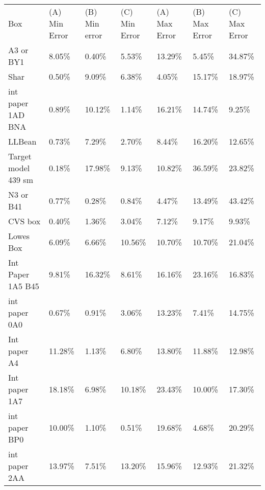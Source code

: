 \documentclass[11pt, twoside, reqno]{book}
\begin{document}
\begin{table}[]
	\centering

	\label{AR2B}
	\tiny
	\begin{tabular}{lllllll}
		Box                 & (A) Min Error & (B) Min error & (C) Min Error & (A) Max Error & (B) Max Error & (C) Max Error \\
		A3 or BY1           & 8.05\%        & 0.40\%        & 5.53\%        & 13.29\%       & 5.45\%        & 34.87\%       \\
		Shar                & 0.50\%        & 9.09\%        & 6.38\%        & 4.05\%        & 15.17\%       & 18.97\%       \\
		int paper 1AD BNA   & 0.89\%        & 10.12\%       & 1.14\%        & 16.21\%       & 14.74\%       & 9.25\%        \\
		LLBean              & 0.73\%        & 7.29\%        & 2.70\%        & 8.44\%        & 16.20\%       & 12.65\%       \\
		Target model 439 sm & 0.18\%        & 17.98\%       & 9.13\%        & 10.82\%       & 36.59\%       & 23.82\%       \\
		N3 or B41           & 0.77\%        & 0.28\%        & 0.84\%        & 4.47\%        & 13.49\%       & 43.42\%       \\
		CVS box             & 0.40\%        & 1.36\%        & 3.04\%        & 7.12\%        & 9.17\%        & 9.93\%        \\
		Lowes Box           & 6.09\%        & 6.66\%        & 10.56\%       & 10.70\%       & 10.70\%       & 21.04\%       \\
		Int Paper 1A5 B45   & 9.81\%        & 16.32\%       & 8.61\%        & 16.16\%       & 23.16\%       & 16.83\%       \\
		int paper 0A0       & 0.67\%        & 0.91\%        & 3.06\%        & 13.23\%       & 7.41\%        & 14.75\%       \\
		Int paper A4        & 11.28\%       & 1.13\%        & 6.80\%        & 13.80\%       & 11.88\%       & 12.98\%       \\
		Int paper 1A7       & 18.18\%       & 6.98\%        & 10.18\%       & 23.43\%       & 10.00\%       & 17.30\%       \\
		int paper BP0       & 10.00\%       & 1.10\%        & 0.51\%        & 19.68\%       & 4.68\%        & 20.29\%       \\
		int paper 2AA       & 13.97\%       & 7.51\%        & 13.20\%       & 15.96\%       & 12.93\%       & 21.32\%       \\

\end{tabular}
\end{table}
\end{document}
